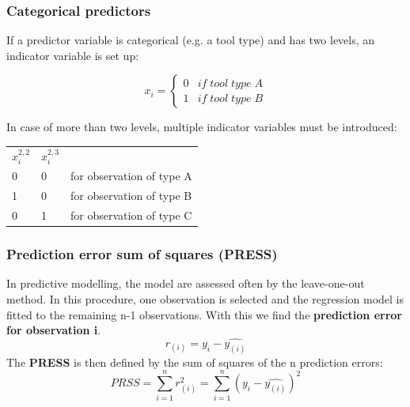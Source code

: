 \subsubsection{Categorical predictors}
If a predictor variable is categorical (e.g. a tool type) and has two levels, an indicator variable is set up:

\begin{equation*}
x_i = \begin{cases}
0 & if \; tool\; type\; A \\
1 & if\; tool\; type\; B
\end{cases}
\end{equation*}

In case of more than two levels, multiple indicator variables must be introduced:

\begin{tabular}{lll}
	$x_i^{2,2}$ & $x_i^{2,3}$  &  \\ 
	0 & 0 & for observation of type A \\ 
	1 & 0 & for observation of type B \\ 
	0 & 1 & for observation of type C \\ 
\end{tabular}

\subsubsection{Prediction error sum of squares (PRESS)}
In predictive modelling, the model are assessed often by the leave-one-out method. In this procedure, one observation is selected and the regression model is fitted to the remaining n-1 observations. With this we find the \textbf{prediction error for observation i}.
\begin{equation*}
r_{(i)}=y_i-\hat{y_(i)}
\end{equation*}
The \textbf{PRESS} is then defined by the sum of squares of the n prediction errors:
\begin{equation*}
PRSS = \sum_{i=1}^{n}r^2_{(i)} = \sum_{i=1}^{n}(y_i-\hat{y_{(i)}})^2
\end{equation*}

